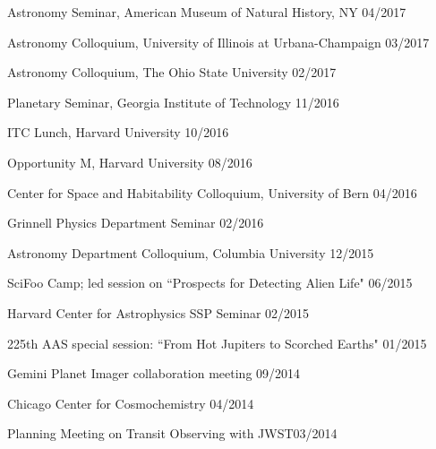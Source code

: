 \documentclass[12pt,letterpaper]{article}
\begin{document}
\begin{compactitem}[]
\item {Astronomy Seminar, American Museum of Natural History, NY \hfill 04/2017}
\item {Astronomy Colloquium, University of Illinois at Urbana-Champaign \hfill 03/2017}
\item {Astronomy Colloquium, The Ohio State University \hfill 02/2017}
\item {Planetary Seminar, Georgia Institute of Technology \hfill 11/2016}
\item {ITC Lunch, Harvard University \hfill 10/2016}
\item {Opportunity M, Harvard University \hfill 08/2016}
\item {Center for Space and Habitability Colloquium, University of Bern \hfill 04/2016}
\item {Grinnell Physics Department Seminar \hfill 02/2016}
\item {Astronomy Department Colloquium, Columbia University \hfill 12/2015}
\item {SciFoo Camp; led session on ``Prospects for Detecting Alien Life" \hfill 06/2015}
\item {Harvard Center for Astrophysics SSP Seminar \hfill 02/2015}
\item {225th AAS special session: ``From Hot Jupiters to Scorched Earths" \hfill 01/2015}
\item {Gemini Planet Imager collaboration meeting \hfill 09/2014}
\item {Chicago Center for Cosmochemistry \hfill 04/2014}
\item {Planning Meeting on Transit Observing with JWST\hfill 03/2014}
\end{compactitem}
\end{document}
